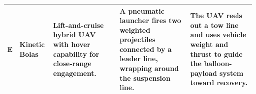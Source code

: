 \begin{table}[H]
\begin{tabularx}{\textwidth}{@{}p{} p{} X X X@{}}
        E 
        & Kinetic Bolas
        & Lift-and-cruise hybrid UAV with hover capability for close-range engagement.
        & A pneumatic launcher fires two weighted projectiles connected by a leader line, wrapping around the suspension line.
        & The UAV reels out a tow line and uses vehicle weight and thrust to guide the balloon-payload system toward recovery. \\

        \bottomrule
    \end{tabularx}
\end{table}
